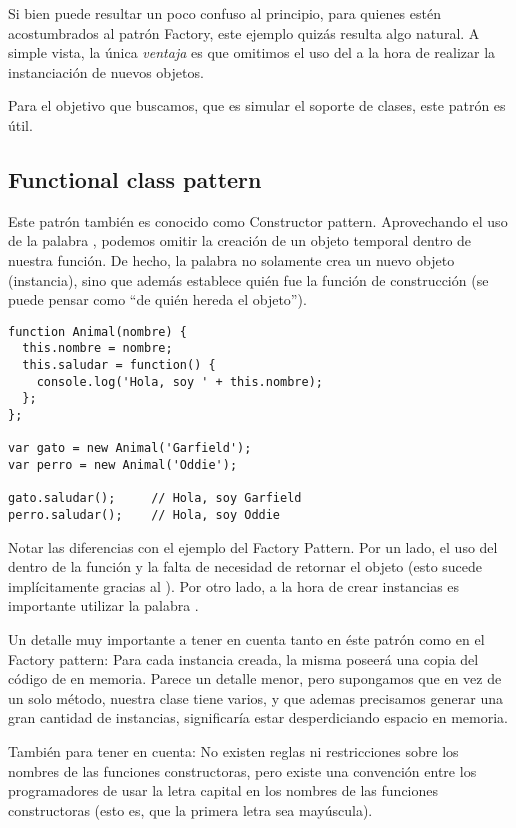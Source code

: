Si bien puede resultar un poco confuso al principio, para quienes estén acostumbrados al patrón Factory, este ejemplo quizás resulta algo natural. A simple vista, la única \textit{ventaja} es que omitimos el uso del  a la hora de realizar la instanciación de nuevos objetos. 

Para el objetivo que buscamos, que es simular el soporte de clases, este patrón es útil.

\subsection{Functional class pattern}

Este patrón también es conocido como Constructor pattern. Aprovechando el uso de la palabra , podemos omitir la creación de un objeto temporal dentro de nuestra función. De hecho, la palabra  no solamente crea un nuevo objeto (instancia), sino que además establece quién fue la función de construcción (se puede pensar como "`de quién hereda el objeto"').

\begin{lstlisting}[title={Functional class pattern}]
function Animal(nombre) {
  this.nombre = nombre;
  this.saludar = function() {
    console.log('Hola, soy ' + this.nombre);
  };
};

var gato = new Animal('Garfield');
var perro = new Animal('Oddie');

gato.saludar();		// Hola, soy Garfield
perro.saludar();	// Hola, soy Oddie
\end{lstlisting}

Notar las diferencias con el ejemplo del Factory Pattern. Por un lado, el uso del  dentro de la función y la falta de necesidad de retornar el objeto (esto sucede implícitamente gracias al ). Por otro lado, a la hora de crear instancias es importante utilizar la palabra .

Un detalle muy importante a tener en cuenta tanto en éste patrón como en el Factory pattern: Para cada instancia creada, la misma poseerá una copia del código de  en memoria. Parece un detalle menor, pero supongamos que en vez de un solo método, nuestra clase tiene varios, y que ademas precisamos generar una gran cantidad de instancias, significaría estar desperdiciando espacio en memoria.

También para tener en cuenta: No existen reglas ni restricciones sobre los nombres de las funciones constructoras, pero existe una convención entre los programadores de usar la letra capital en los nombres de las funciones constructoras (esto es, que la primera letra sea mayúscula).


